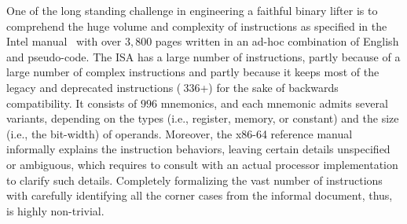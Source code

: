 One of the long standing challenge in engineering a faithful binary lifter is
to comprehend the huge volume and complexity of instructions as specified in
the Intel manual~\cite{IntelManual} with over $3,800$ pages written in an
ad-hoc combination of English and pseudo-code. The \ISA ISA has a large number
of instructions, partly because of a large number of complex instructions and
partly because it keeps most of the legacy and deprecated instructions
($~336$+) for the sake of backwards compatibility. It consists of $996$
mnemonics, and each mnemonic admits several variants, depending on the types
(i.e., register, memory, or constant) and the size (i.e., the bit-width) of
operands. Moreover, the x86-64 reference manual informally explains the
instruction behaviors, leaving certain details unspecified or ambiguous, which
requires  to consult with an actual processor implementation to clarify such
details. Completely formalizing the vast number of instructions with carefully
identifying all the corner cases from the informal document, thus, is highly
non-trivial.
